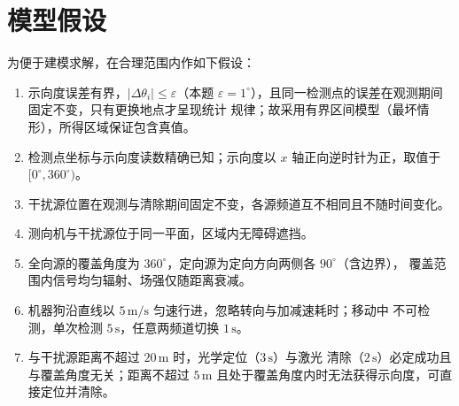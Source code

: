 \section{模型假设}
为便于建模求解，在合理范围内作如下假设：

\begin{enumerate}
    \item 示向度误差有界，$|\Delta\theta_i|\le\varepsilon$（本题 $\varepsilon
          =1^\circ$），且同一检测点的误差在观测期间固定不变，只有更换地点才呈现统计
          规律；故采用有界区间模型（最坏情形），所得区域保证包含真值。
    \item 检测点坐标与示向度读数精确已知；示向度以 $x$ 轴正向逆时针为正，取值于
          $[0^\circ,360^\circ)$。
    \item 干扰源位置在观测与清除期间固定不变，各源频道互不相同且不随时间变化。
    \item 测向机与干扰源位于同一平面，区域内无障碍遮挡。
    \item 全向源的覆盖角度为 $360^\circ$，定向源为定向方向两侧各 $90^\circ$（含边界），
          覆盖范围内信号均匀辐射、场强仅随距离衰减。
    \item 机器狗沿直线以 $5\,\mathrm{m/s}$ 匀速行进，忽略转向与加减速耗时；移动中
          不可检测，单次检测 $5\,\mathrm{s}$，任意两频道切换 $1\,\mathrm{s}$。
    \item 与干扰源距离不超过 $20\,\mathrm{m}$ 时，光学定位（$3\,\mathrm{s}$）与激光
          清除（$2\,\mathrm{s}$）必定成功且与覆盖角度无关；距离不超过 $5\,\mathrm{m}$
          且处于覆盖角度内时无法获得示向度，可直接定位并清除。
\end{enumerate}
